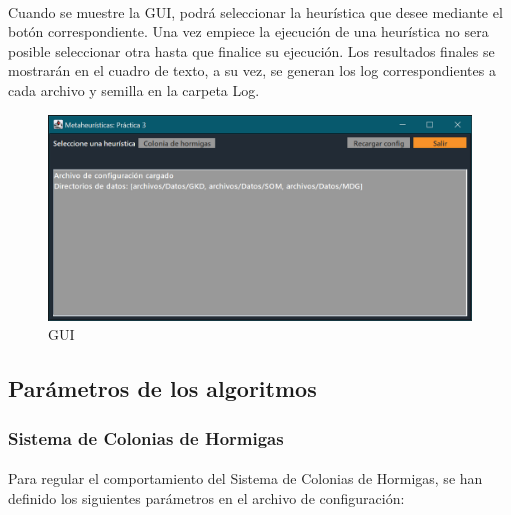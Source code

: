 		\paragraph{}Cuando se muestre la GUI, podrá seleccionar la heurística que desee mediante el botón correspondiente. Una vez empiece la ejecución de una heurística no sera posible seleccionar otra hasta que finalice su ejecución. Los resultados finales se mostrarán en el cuadro de texto, a su vez, se generan los log correspondientes a cada archivo y semilla en la carpeta Log.
	
		\begin{figure}[H]
		
			\centering
			\includegraphics[scale=0.4]{img/GUI}
			\caption{GUI}
		
		\end{figure}
	
	\subsection{Parámetros de los algoritmos}
	
		\subsubsection{Sistema de Colonias de Hormigas}

		\paragraph{}Para regular el comportamiento del Sistema de Colonias de Hormigas, se han definido los siguientes parámetros en el archivo de configuración:
		

